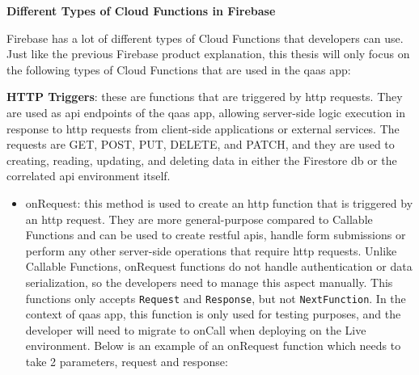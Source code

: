 \textbf{Different Types of Cloud Functions in Firebase}

Firebase has a lot of different types of Cloud Functions that developers can use. Just like the previous Firebase product
explanation, this thesis will only focus on the following types of Cloud Functions that are used in the \acrshort{qaas} app:

\textbf{HTTP Triggers}: these are functions that are triggered by \acrshort{http} requests. They are used as \acrshort{api}
endpoints of the \acrshort{qaas} app, allowing server-side logic execution in response to \acrshort{http} requests from
client-side applications or external services. The requests are GET, POST, PUT, DELETE, and PATCH, and they are used to
creating, reading, updating, and deleting data in either the Firestore \acrshort{db} or the correlated \acrshort{api}
environment itself.

\begin{itemize}
      \item onRequest: this method is used to create an \acrshort{http} function that is triggered by an \acrshort{http}
            request. They are more general-purpose compared to Callable Functions and can be used to create \acrshort{rest}ful
            \acrshort{api}s, handle form submissions or perform any other server-side operations that require \acrshort{http}
            requests. Unlike Callable Functions, onRequest functions do not handle authentication or data serialization, so
            the developers need to manage this aspect manually. This functions only accepts \texttt{Request} and
            \texttt{Response}, but not \texttt{NextFunction}. In the context of \acrshort{qaas} app, this function is only used
            for testing purposes, and the developer will need to migrate to onCall when deploying on the Live environment.
            Below is an example of an onRequest function which needs to take 2 parameters, request and response:
\end{itemize}

